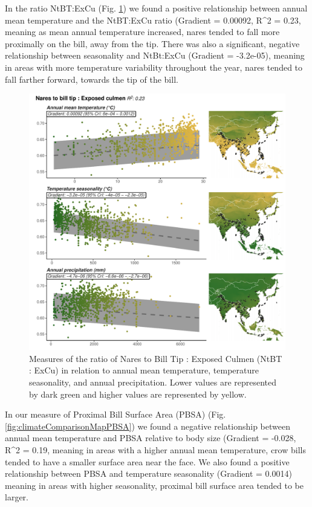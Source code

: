 \documentclass[10pt,a4paper]{article}
\begin{document}
In the ratio NtBT:ExCu (Fig. \ref{fig:climateComparisonMapNtBTExCu}) we found a positive relationship between annual mean temperature and the NtBT:ExCu ratio (Gradient = 0.00092, R\^{}2 = 0.23, meaning as mean annual temperature increased, nares tended to fall more proximally on the bill, away from the tip.
There was also a significant, negative relationship between seasonality and NtBt:ExCu (Gradient = -3.2e-05), meaning in areas with more temperature variability throughout the year, nares tended to fall farther forward, towards the tip of the bill.

\begin{figure}
\includegraphics[width=0.9\linewidth]{../Figures/climMap_NtBT.ExCu} \caption{Measures of the ratio of Nares to Bill Tip : Exposed Culmen (NtBT : ExCu) in relation to annual mean temperature, temperature seasonality, and annual precipitation. Lower values are represented by dark green and higher values are represented by yellow.}\label{fig:climateComparisonMapNtBTExCu}
\end{figure}

In our measure of Proximal Bill Surface Area (PBSA) (Fig. \ref{fig:climateComparisonMapPBSA}) we found a negative relationship between annual mean temperature and PBSA relative to body size (Gradient = -0.028, R\^{}2 = 0.19, meaning in areas with a higher annual mean temperature, crow bills tended to have a smaller surface area near the face.
We also found a positive relationship between PBSA and temperature seasonality (Gradient = 0.0014) meaning in areas with higher seasonality, proximal bill surface area tended to be larger.
\end{document}
